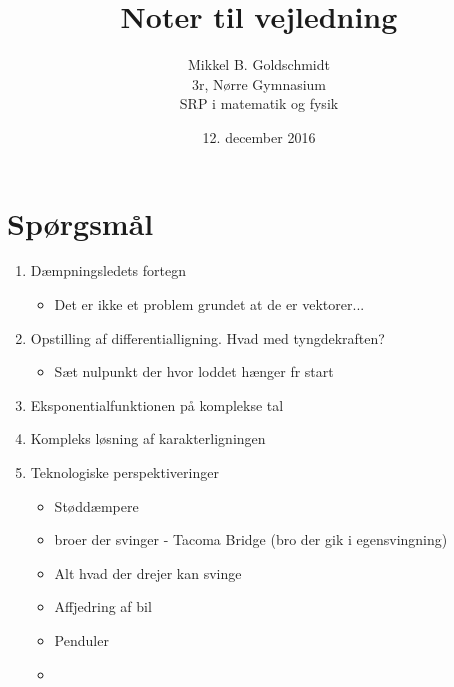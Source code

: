 \documentclass[11pt,a4paper]{article}
\author{Mikkel B. Goldschmidt \\ 3r, Nørre Gymnasium \\ SRP i matematik og fysik}
\title{Noter til vejledning}
\date{12. december 2016}
\begin{document}
\maketitle
\section*{Spørgsmål}
\begin{enumerate}
	\item Dæmpningsledets fortegn
		\begin{itemize}
			\item Det er ikke et problem grundet at de er vektorer...
		\end{itemize}
	\item Opstilling af differentialligning. Hvad med tyngdekraften?
		\begin{itemize}
			\item Sæt nulpunkt der hvor loddet hænger fr start
		\end{itemize}
	\item Eksponentialfunktionen på komplekse tal
	\item Kompleks løsning af karakterligningen
	
	\item Teknologiske perspektiveringer
	\begin{itemize}
		\item Støddæmpere
		\item broer der svinger - Tacoma Bridge (bro der gik i egensvingning)
		\item Alt hvad der drejer kan svinge
		\item Affjedring af bil
		\item Penduler
		\item 
	\end{itemize}
\end{enumerate}
\end{document}
